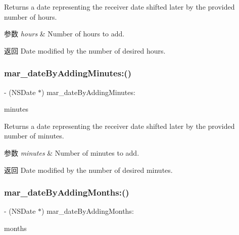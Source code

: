 Returns a date representing the receiver date shifted later by the provided number of hours.


\begin{DoxyParams}{参数}
{\em hours} & Number of hours to add. \\
\hline
\end{DoxyParams}
\begin{DoxyReturn}{返回}
Date modified by the number of desired hours. 
\end{DoxyReturn}
\mbox{\label{category_n_s_date_07_m_a_r_e_x_08_abdf3ea678b2e1861e429905afd45d365}} 
\subsubsection{\texorpdfstring{mar\+\_\+date\+By\+Adding\+Minutes\+:()}{mar\_dateByAddingMinutes:()}}
{\footnotesize\ttfamily -\/ (N\+S\+Date $\ast$) mar\+\_\+date\+By\+Adding\+Minutes\+: \begin{DoxyParamCaption}\item[{(N\+S\+Integer)}]{minutes }\end{DoxyParamCaption}}

Returns a date representing the receiver date shifted later by the provided number of minutes.


\begin{DoxyParams}{参数}
{\em minutes} & Number of minutes to add. \\
\hline
\end{DoxyParams}
\begin{DoxyReturn}{返回}
Date modified by the number of desired minutes. 
\end{DoxyReturn}
\mbox{\label{category_n_s_date_07_m_a_r_e_x_08_a324d33275422b3b4d35bea5c5a4d7707}} 
\subsubsection{\texorpdfstring{mar\+\_\+date\+By\+Adding\+Months\+:()}{mar\_dateByAddingMonths:()}}
{\footnotesize\ttfamily -\/ (N\+S\+Date $\ast$) mar\+\_\+date\+By\+Adding\+Months\+: \begin{DoxyParamCaption}\item[{(N\+S\+Integer)}]{months }\end{DoxyParamCaption}}

